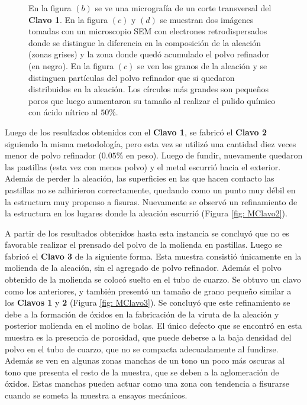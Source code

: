 \documentclass[a4paper,12pt,fleqn,twoside,openany]{book}
\begin{document}
\begin{figure}
\begin{subfigure}{0.3\textwidth}
        \caption{}%
        \label{fig: Sem2Clavo1}
    \end{subfigure}
    \caption{En la figura $(b)$ se ve una micrografía de un corte transversal del \textbf{Clavo 1}. En la figura $(c)$ y $(d)$ se muestran dos imágenes tomadas con un microscopio SEM con electrones retrodispersados donde se distingue la diferencia en la composición de la aleación (zonas grises) y la zona donde quedó acumulado el polvo refinador (en negro). En la figura $(c)$ se ven los granos de la aleación y se distinguen partículas del polvo refinador que si quedaron distribuidos en la aleación. Los círculos más grandes son pequeños poros que luego aumentaron su tamaño al realizar el pulido químico con ácido nítrico al $50 \%$.}
    \end{figure}

Luego de los resultados obtenidos con el \textbf{Clavo 1}, se fabricó el \textbf{Clavo 2} siguiendo la misma metodología, pero esta vez se utilizó una cantidad diez veces menor de polvo refinador ($0.05\%$ en peso). Luego de fundir, nuevamente quedaron las pastillas (esta vez con menos polvo) y el metal escurrió hacia el exterior. Además de perder la aleación, las superficies en las que hacen contacto las pastillas no se adhirieron correctamente, quedando como un punto muy débil en la estructura muy propenso a fisuras. Nuevamente se observó un refinamiento de la estructura en los lugares donde la aleación escurrió (Figura \ref{fig: MClavo2}).

A partir de los resultados obtenidos hasta esta instancia se concluyó que no es favorable realizar el prensado del polvo de la molienda en pastillas. 
Luego se fabricó el \textbf{Clavo 3} de la siguiente forma. Esta muestra consistió únicamente en la molienda de la aleación, sin el agregado de polvo refinador. Además el polvo obtenido de la molienda se colocó suelto en el tubo de cuarzo. Se obtuvo un clavo como los anteriores, y también presentó un tamaño de grano pequeño similar a los \textbf{Clavos 1} y \textbf{2} (Figura \ref{fig: MClavo3}). Se concluyó que este refinamiento se debe a la formación de óxidos en la fabricación de la viruta de la aleación y posterior molienda en el molino de bolas. El único defecto que se encontró en esta muestra es la presencia de porosidad, que puede deberse a la baja densidad del polvo en el tubo de cuarzo, que no se compacta adecuadamente al fundirse. Además se ven en algunas zonas manchas de un tono un poco más oscuras al tono que presenta el resto de la muestra, que se deben a la aglomeración de óxidos. Estas manchas pueden actuar como una zona con tendencia a fisurarse cuando se someta la muestra a ensayos mecánicos. 
\end{document}
